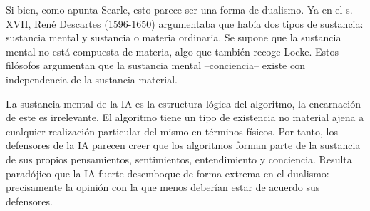 \documentclass[main.tex]{subfiles}
\begin{document}
Si bien, como apunta Searle, esto parece ser una forma de dualismo. Ya en el s. XVII, René Descartes (1596-1650) argumentaba que había dos tipos de sustancia: sustancia mental y sustancia o materia ordinaria. Se supone que la sustancia mental no está compuesta de materia, algo que también recoge Locke. Estos filósofos argumentan que la sustancia mental –conciencia– existe con independencia de la sustancia material. 

La sustancia mental de la IA es la estructura lógica del algoritmo, la encarnación de este es irrelevante. El algoritmo tiene un tipo de existencia no material ajena a cualquier realización particular del mismo en términos físicos. Por tanto, los defensores de la IA parecen creer que los algoritmos forman parte de la sustancia de sus propios pensamientos, sentimientos, entendimiento y  conciencia. Resulta paradójico que la IA fuerte desemboque de forma extrema en el dualismo: precisamente la opinión con la que menos deberían estar de acuerdo sus defensores.
\end{document}
